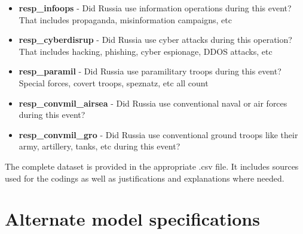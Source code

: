 \documentclass[
]{article}
\providecommand{\tightlist}{%
  \setlength{\itemsep}{0pt}\setlength{\parskip}{0pt}}
\begin{document}
\begin{itemize}
\tightlist
\item
  \textbf{resp\_infoops} - Did Russia use information operations during
  this event? That includes propaganda, misinformation campaigns, etc
\item
  \textbf{resp\_cyberdisrup} - Did Russia use cyber attacks during this
  operation? That includes hacking, phishing, cyber espionage, DDOS
  attacks, etc
\item
  \textbf{resp\_paramil} - Did Russia use paramilitary troops during
  this event? Special forces, covert troops, speznatz, etc all count
\item
  \textbf{resp\_convmil\_airsea} - Did Russia use conventional naval or
  air forces during this event?
\item
  \textbf{resp\_convmil\_gro} - Did Russia use conventional ground
  troops like their army, artillery, tanks, etc during this event?
\end{itemize}

The complete dataset is provided in the appropriate .csv file. It
includes sources used for the codings as well as justifications and
explanations where needed.

\hypertarget{alternate-model-specifications}{%
\section{Alternate model
specifications}\label{alternate-model-specifications}}
\end{document}
